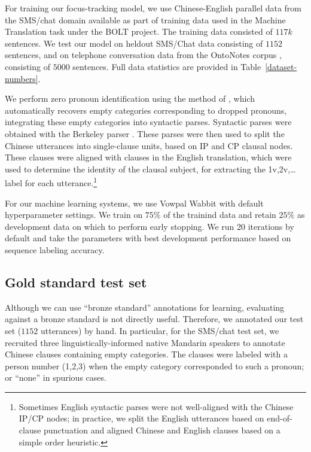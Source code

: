 \documentclass[11pt]{report}
\renewcommand\cite{\citep}	%
\begin{document}
For training our focus-tracking model, we use Chinese-English parallel data from the SMS/chat domain available as part of training data used in the Machine Translation task under the BOLT project. The training data consisted of $117k$ sentences. We test our model on heldout SMS/Chat data consisting of $1152$ sentences, and on telephone conversation data from the OntoNotes corpus \cite{hovy2006ontonotes}, consisting of $5000$ sentences. Full data statistics are provided in Table~\ref{dataset-numbers}.

We perform zero pronoun identification using the method of \cite{cai2011language}, which automatically recovers empty categories corresponding to dropped pronouns, integrating these empty categories into syntactic parses. Syntactic parses were obtained with the Berkeley parser \cite{petrov2007improved}. These parses were then used to split the Chinese utterances into single-clause units, based on IP and CP clausal nodes. These clauses were aligned with clauses in the English translation, which were used to determine the identity of the clausal subject, for extracting the 1v,2v,\dots label for each utterance.\footnote{Sometimes English syntactic parses were not well-aligned with the Chinese IP/CP nodes; in practice, we split the English utterances based on end-of-clause punctuation and aligned Chinese and English clauses based on a simple order heuristic.}

For our machine learning systems, we use Vowpal Wabbit \cite{langford2007vowpal} with default hyperparameter settings. We train on $75\%$ of the trainind data and retain $25\%$ as development data on which to perform early stopping. We run 20 iterations by default and take the parameters with best development performance based on sequence labeling accuracy.

\subsection{Gold standard test set} \label{gold}

Although we can use ``bronze standard'' annotations for learning, evaluating against a bronze standard is not directly useful. Therefore, we annotated our test set ($1152$ utterances) by hand. In particular, for the SMS/chat test set, we recruited three linguistically-informed native Mandarin speakers to annotate Chinese clauses containing empty categories. The clauses were labeled with a person number (1,2,3) when the empty category corresponded to such a pronoun; or ``none'' in spurious cases.
\end{document}
